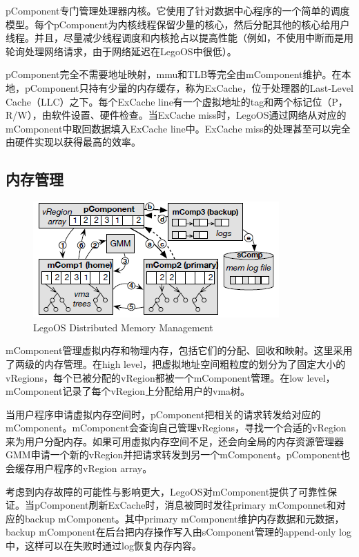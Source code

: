 pComponent专门管理处理器内核。它使用了针对数据中心程序的一个简单的调度模型。每个pComponent为内核线程保留少量的核心，然后分配其他的核心给用户线程。并且，尽量减少线程调度和内核抢占以提高性能（例如，不使用中断而是用轮询处理网络请求，由于网络延迟在LegoOS中很低）。

pComponent完全不需要地址映射，mmu和TLB等完全由mComponent维护。在本地，pComponent只持有少量的内存缓存，称为ExCache，位于处理器的Last-Level Cache（LLC）之下。每个ExCache line有一个虚拟地址的tag和两个标记位（P，R/W），由软件设置、硬件检查。当ExCache miss时，LegoOS通过网络从对应的mComponent中取回数据填入ExCache line中。ExCache miss的处理甚至可以完全由硬件实现以获得最高的效率。


\subsection{内存管理}

\begin{figure}[h]
\centering
\includegraphics[scale=1.00]{Figures/legoos/2.png}
\decoRule
\caption{LegoOS Distributed Memory Management}
\label{fig:legoos_memory_management}
\end{figure}

mComponent管理虚拟内存和物理内存，包括它们的分配、回收和映射。这里采用了两级的内存管理。在high level，把虚拟地址空间粗粒度的划分为了固定大小的vRegions，每个已被分配的vRegion都被一个mComponent管理。在low level，mComponent记录了每个vRegion上分配给用户的vma树。

当用户程序申请虚拟内存空间时，pComponent把相关的请求转发给对应的mComponent。mComponent会查询自己管理vRegions，寻找一个合适的vRegion来为用户分配内存。如果可用虚拟内存空间不足，还会向全局的内存资源管理器GMM申请一个新的vRegion并把请求转发到另一个mComponent。pComponent也会缓存用户程序的vRegion array。

考虑到内存故障的可能性与影响更大，LegoOS对mComponent提供了可靠性保证。当pComponent刷新ExCache时，消息被同时发往primary mComponnet和对应的backup mComponent。其中primary mComponent维护内存数据和元数据，backup mComponent在后台把内存操作写入由sComponent管理的append-only log中，这样可以在失败时通过log恢复内存内容。

